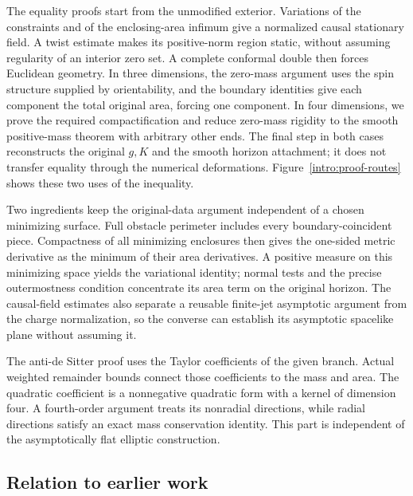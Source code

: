 The equality proofs start from the unmodified exterior. Variations of
the constraints and of the enclosing-area infimum give a normalized
causal stationary field. A twist estimate makes its positive-norm
region static, without assuming regularity of an interior zero set.
A complete conformal double then forces Euclidean geometry. In three
dimensions, the zero-mass argument uses the spin structure supplied
by orientability, and the boundary identities give each component
the total original area, forcing one component. In four dimensions,
we prove the required compactification and reduce zero-mass rigidity
to the smooth positive-mass theorem with arbitrary other ends.
The final step in both cases reconstructs the original $g,K$ and
the smooth horizon attachment; it does not transfer equality through
the numerical deformations. Figure~\ref{intro:proof-routes} shows
these two uses of the inequality.

Two ingredients keep the original-data argument independent of a
chosen minimizing surface. Full obstacle perimeter includes every
boundary-coincident piece. Compactness of all minimizing enclosures
then gives the one-sided metric derivative as the minimum of their
area derivatives. A positive measure on this minimizing space yields
the variational identity; normal tests and the precise outermostness
condition concentrate its area term on the original horizon.
The causal-field estimates also separate a reusable finite-jet
asymptotic argument from the charge normalization, so the converse
can establish its asymptotic spacelike plane without assuming it.



The anti-de Sitter proof uses the Taylor coefficients of the given
branch. Actual weighted remainder bounds connect those coefficients
to the mass and area. The quadratic coefficient is a nonnegative quadratic
form with a kernel of dimension four. A fourth-order argument treats its
nonradial directions,
while radial directions satisfy an exact mass conservation identity.
This part is independent of the asymptotically flat elliptic construction.

\subsection{Relation to earlier work}

